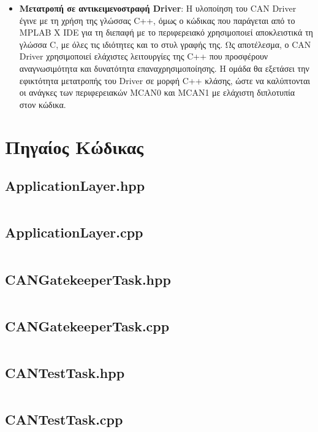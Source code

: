 \documentclass[a4paper,nobib,justified]{tufte-book}
\begin{document}
\begin{itemize}
	\item \textbf{Μετατροπή σε αντικειμενοστραφή Driver}: Η υλοποίηση του CAN Driver έγινε με τη χρήση της γλώσσας C++, όμως ο κώδικας που παράγεται από το MPLAB X IDE για τη διεπαφή με το περιφερειακό χρησιμοποιεί αποκλειστικά τη γλώσσα C, με όλες τις ιδιότητες και το στυλ γραφής της. Ως αποτέλεσμα, ο CAN Driver χρησιμοποιεί ελάχιστες λειτουργίες της C++ που προσφέρουν αναγνωσιμότητα και δυνατότητα επαναχρησιμοποίησης. Η ομάδα θα εξετάσει την εφικτότητα μετατροπής του Driver σε μορφή C++ κλάσης, ώστε να καλύπτονται οι ανάγκες των περιφερειακών MCAN0 και MCAN1 με ελάχιστη διπλοτυπία στον κώδικα.
\end{itemize}

\appendix

\begin{fullwidth}
\bgroup
\printbibliography[heading=bibnumbered,title={Βιβλιογραφία}]
\egroup
\end{fullwidth}

\chapter{Πηγαίος Κώδικας}

\section*{ApplicationLayer.hpp}
\inputminted{cpp}{code/full-files/ApplicationLayer.hpp}
\newpage
\section*{ApplicationLayer.cpp}
\inputminted{cpp}{code/full-files/ApplicationLayer.cpp}
\newpage
\section*{CANGatekeeperTask.hpp}
\inputminted{cpp}{code/full-files/CANGatekeeperTask.hpp}
\newpage
\section*{CANGatekeeperTask.cpp}
\inputminted{cpp}{code/full-files/CANGatekeeperTask.cpp}
\newpage
\section*{CANTestTask.hpp}
\inputminted{cpp}{code/full-files/CANTestTask.hpp}
\newpage
\section*{CANTestTask.cpp}
\inputminted{cpp}{code/full-files/CANTestTask.cpp}
\newpage
\end{document}
